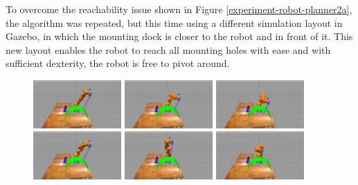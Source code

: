 To overcome the reachability issue shown in Figure \ref{experiment-robot-planner2a}, the algorithm was repeated, but this time using a different simulation layout 
in Gazebo, in which the mounting dock is closer to the robot and in front of it. This new layout enables the robot to reach all mounting holes with ease and 
with sufficient dexterity, the robot is free to pivot around.

\begin{center}
\begin{figure}[!htb]
\centering
\includegraphics[width=0.3\textwidth]{images/robot_planner2b/robot_planner2b_1}
\includegraphics[width=0.3\textwidth]{images/robot_planner2b/robot_planner2b_2}
\includegraphics[width=0.3\textwidth]{images/robot_planner2b/robot_planner2b_3}\\
\includegraphics[width=0.3\textwidth]{images/robot_planner2b/robot_planner2b_4}
\includegraphics[width=0.3\textwidth]{images/robot_planner2b/robot_planner2b_5}
\includegraphics[width=0.3\textwidth]{images/robot_planner2b/robot_planner2b_6}\\

\end{figure}
\end{center}
